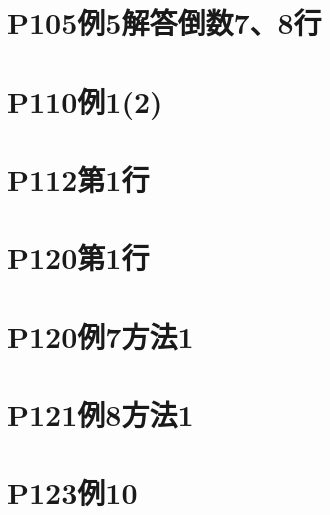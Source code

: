 \documentclass[a4paper]{ctexart}
\begin{document}
\begin{multicols}{2}
\section{P105例5解答倒数7、8行}

\section{P110例1(2)}

\section{P112第1行}

\section{P120第1行}

\section{P120例7方法1}

\section{P121例8方法1}

\section{P123例10}
\end{multicols}
\end{document}
